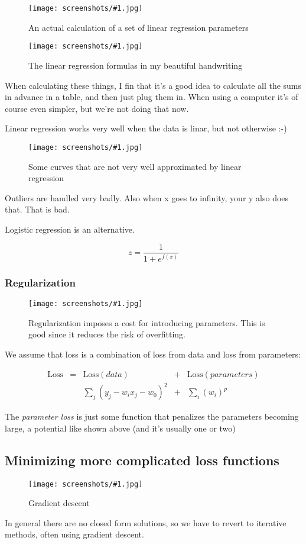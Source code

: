 \documentclass[a4, 12pt, english, USenglish]{scrreprt}
\newcommand{\screenshot}[2]{
\begin{figure}[htb]
\texttt{[image: screenshots/\#1.jpg]}
\label{#1}
\caption{#2}
\end{figure}}
\newcommand{\parens}[1]{\ensuremath{\left({#1}\right)}}
\newcommand{\idx}[1]{{\em #1}\index{#1}}
\begin{document}
\screenshot{linearregressionquiz}{An actual calculation of a set of
  linear regression parameters}

\screenshot{linearregressionformulahand}{The linear regression
  formulas in my beautiful handwriting}

When calculating these things, I fin that it's a good idea to
calculate all the sums in advance in a table, and then just plug them
in.  When using a computer it's of course even simpler, but we're not
doing that now.


Linear regression works very well when the data is linar, but not
otherwise :-) 

\screenshot{poorlinearregression}{Some curves that are not very well
  approximated by linear regression}

Outliers are handled very badly.  Also when x goes to infinity, your y
also does that.  That is bad.

Logistic regression is an alternative.

\[
     z = \frac{1}{1 + e^{f(x)}}
\]

\subsubsection{Regularization}

\screenshot{regularization}{Regularization imposes a cost for
  introducing parameters.  This is good since it reduces the risk of overfitting.}
We assume that loss is a combination of loss from data and loss from
parameters:

\[
\begin{array}{lclccc}
   \mbox{Loss} &=&    \mbox{Loss}(data) &+&   \mbox{Loss}(parameters)\\
   &&\sum_j\parens{y_j - w_ix_j-w_0}^2 &+& \sum_i\parens{w_i}^p
\end{array}
\]

The \idx{parameter loss} is just some function that penalizes the
parameters becoming large, a potential like shown above (and it's
usually one or two)

 
\subsection{Minimizing more complicated loss functions}

\screenshot{gradientdescent}{Gradient descent}

In general there are no closed form solutions, so we have to revert to
iterative methods, often using gradient descent.
\end{document}

